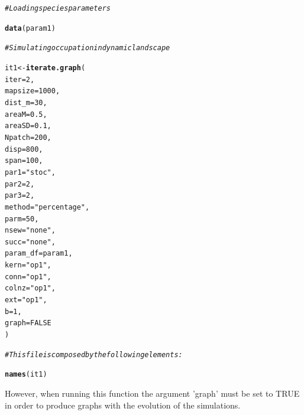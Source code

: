 \documentclass{article}\usepackage[]{graphicx}\usepackage[]{xcolor}
\makeatletter
\newcommand{\hlnum}[1]{\textcolor[rgb]{0.686,0.059,0.569}{#1}}%
\newcommand{\hlsng}[1]{\textcolor[rgb]{0.192,0.494,0.8}{#1}}%
\newcommand{\hlcom}[1]{\textcolor[rgb]{0.678,0.584,0.686}{\textit{#1}}}%
\newcommand{\hldef}[1]{\textcolor[rgb]{0.345,0.345,0.345}{#1}}%
\newcommand{\hlkwb}[1]{\textcolor[rgb]{0.69,0.353,0.396}{#1}}%
\newcommand{\hlkwc}[1]{\textcolor[rgb]{0.333,0.667,0.333}{#1}}%
\newcommand{\hlkwd}[1]{\textcolor[rgb]{0.737,0.353,0.396}{\textbf{#1}}}%
\newenvironment{kframe}{%
 \def\at@end@of@kframe{}%
 \ifinner\ifhmode%
  \def\at@end@of@kframe{\end{minipage}}%
  \begin{minipage}{\columnwidth}%
 \fi\fi%
 \def\FrameCommand##1{\hskip\@totalleftmargin \hskip-\fboxsep
 \colorbox{shadecolor}{##1}\hskip-\fboxsep
     \hskip-\linewidth \hskip-\@totalleftmargin \hskip\columnwidth}%
 \MakeFramed {\advance\hsize-\width
   \@totalleftmargin\z@ \linewidth\hsize
   \@setminipage}}%
 {\par\unskip\endMakeFramed%
 \at@end@of@kframe}
\newenvironment{knitrout}{}{} %
\makeatother
\begin{document}
\begin{knitrout}
\color{fgcolor}\begin{kframe}
\begin{alltt}
\hlcom{#Loading species parameters}

\hlkwd{data}\hldef{(param1)}
\end{alltt}


{\ttfamily\noindent\color{warningcolor}{\#\# Warning in data(param1): data set 'param1' not found}}\begin{alltt}
\hlcom{#Simulating occupation in dynamic landscape}

\hldef{it1} \hlkwb{<-} \hlkwd{iterate.graph}\hldef{(}
\hlkwc{iter} \hldef{=} \hlnum{2}\hldef{,}
\hlkwc{mapsize} \hldef{=} \hlnum{1000}\hldef{,}
\hlkwc{dist_m} \hldef{=} \hlnum{30}\hldef{,}
\hlkwc{areaM} \hldef{=} \hlnum{0.5}\hldef{,}
\hlkwc{areaSD}\hldef{=} \hlnum{0.1}\hldef{,}
\hlkwc{Npatch} \hldef{=} \hlnum{200}\hldef{,}
\hlkwc{disp} \hldef{=} \hlnum{800}\hldef{,}
\hlkwc{span} \hldef{=} \hlnum{100}\hldef{,}
\hlkwc{par1} \hldef{=} \hlsng{"stoc"}\hldef{,}
\hlkwc{par2} \hldef{=} \hlnum{2}\hldef{,}
\hlkwc{par3} \hldef{=} \hlnum{2}\hldef{,}
\hlkwc{method} \hldef{=} \hlsng{"percentage"}\hldef{,}
\hlkwc{parm} \hldef{=} \hlnum{50}\hldef{,}
\hlkwc{nsew} \hldef{=} \hlsng{"none"}\hldef{,}
\hlkwc{succ} \hldef{=} \hlsng{"none"}\hldef{,}
\hlkwc{param_df} \hldef{= param1,}
\hlkwc{kern} \hldef{=} \hlsng{"op1"}\hldef{,}
\hlkwc{conn} \hldef{=} \hlsng{"op1"}\hldef{,}
\hlkwc{colnz} \hldef{=} \hlsng{"op1"}\hldef{,}
\hlkwc{ext} \hldef{=} \hlsng{"op1"}\hldef{,}
\hlkwc{b} \hldef{=} \hlnum{1}\hldef{,}
\hlkwc{graph}  \hldef{=} \hlnum{FALSE}
\hldef{)}
\end{alltt}


{\ttfamily\noindent\bfseries{}}\begin{alltt}
\hlcom{#This file is composed by the following elements: }

\hlkwd{names}\hldef{(it1)}
\end{alltt}


{\ttfamily\noindent\bfseries\color{errorcolor}{\#\# Error: object 'it1' not found}}\end{kframe}
\end{knitrout}

However, when running this function the argument 'graph' must be set to TRUE in order to produce graphs with the evolution of the simulations.
\end{document}
